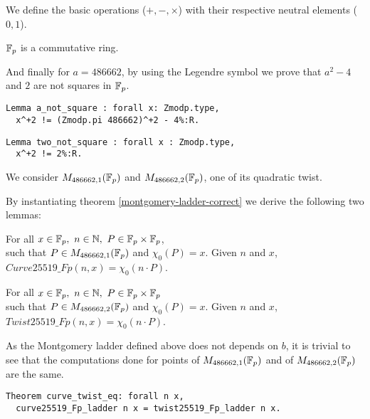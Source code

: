 We define the basic operations ($+, -, \times$) with their respective neutral elements ($0, 1$).
\begin{lemma}
$\mathbb{F}_{p}$ is a commutative ring.
\end{lemma}
%
And finally for $a = 486662$, by using the Legendre symbol we prove that $a^2 - 4$ and $2$ are not squares in $\mathbb{F}_{p}$.
\begin{lstlisting}[language=Coq]
Lemma a_not_square : forall x: Zmodp.type,
  x^+2 != (Zmodp.pi 486662)^+2 - 4%:R.
\end{lstlisting}
\begin{lstlisting}[language=Coq,label=two_not_square]
Lemma two_not_square : forall x : Zmodp.type,
  x^+2 != 2%:R.
\end{lstlisting}
We consider $M_{486662,1}(\mathbb{F}_{p})$ and $M_{486662,2}(\mathbb{F}_{p})$, one of its quadratic twist.


By instantiating theorem \ref{montgomery-ladder-correct} we derive the following two lemmas:
\begin{lemma} For all $x \in \mathbb{F}_{p},\ n \in \mathbb{N},\ P \in \mathbb{F}_{p} \times \mathbb{F}_{p}$,\\
such that $P \in M_{486662,1}(\mathbb{F}_{p})$ and $\chi_0(P) = x$.
Given $n$ and $x$, $Curve25519\_Fp(n,x) = \chi_0(n \cdot P)$.
\end{lemma}
\begin{lemma} For all $x \in \mathbb{F}_{p},\ n \in \mathbb{N},\ P \in \mathbb{F}_{p} \times \mathbb{F}_{p}$\\
such that $P \in M_{486662,2}(\mathbb{F}_{p})$ and $\chi_0(P) = x$.
Given $n$ and $x$, $Twist25519\_Fp(n,x) = \chi_0(n \cdot P)$.
\end{lemma}
As the Montgomery ladder defined above does not depends on $b$, it is trivial to see that the computations done for points of $M_{486662,1}(\mathbb{F}_{p})$ and of $M_{486662,2}(\mathbb{F}_{p})$ are the same.
\begin{lstlisting}[language=Coq]
Theorem curve_twist_eq: forall n x,
  curve25519_Fp_ladder n x = twist25519_Fp_ladder n x.
\end{lstlisting}

